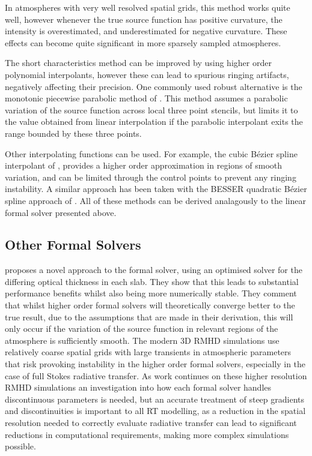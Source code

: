 In atmospheres with very well resolved spatial grids, this method works quite well, however whenever the true source function has positive curvature, the intensity is overestimated, and underestimated for negative curvature. These effects can become quite significant in more sparsely sampled atmospheres.

The short characteristics method can be improved by using higher order polynomial interpolants, however these can lead to spurious ringing artifacts, negatively affecting their precision. One commonly used robust alternative is the monotonic piecewise parabolic method of \citet{Auer1994}. This method assumes a parabolic variation of the source function across local three point stencils, but limits it to the value obtained from linear interpolation if the parabolic interpolant exits the range bounded by these three points.

Other interpolating functions can be used. For example, the cubic Bézier spline interpolant of \citet{DelaCruzRodriguez2013}, provides a higher order approximation in regions of smooth variation, and can be limited through the control points to prevent any ringing instability. A similar approach has been taken with the BESSER quadratic Bézier spline approach of \citet{Stepan2013}.
All of these methods can be derived analagously to the linear formal solver presented above.

\subsection{Other Formal Solvers}

\citet{Janett2018} proposes a novel approach to the formal solver,  using an optimised solver for the differing optical thickness in each slab. They show that this leads to substantial performance benefits whilst also being more numerically stable. They comment that whilst higher order formal solvers will theoretically converge better to the true result, due to the assumptions that are made in their derivation, this will only occur if the variation of the source function in relevant regions of the atmosphere is sufficiently smooth. The modern 3D RMHD simulations use relatively coarse spatial grids with large transients in atmospheric parameters that risk provoking instability in the higher order formal solvers, especially in the case of full Stokes radiative transfer.
As work continues on these higher resolution RMHD simulations an investigation into how each formal solver handles discontinuous parameters is needed, but an accurate treatment of steep gradients and discontinuities is important to all RT modelling, as a reduction in the spatial resolution needed to correctly evaluate radiative transfer can lead to significant reductions in computational requirements, making more complex simulations possible.


